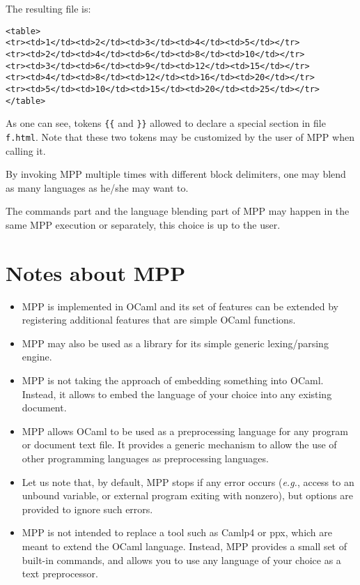 \documentclass[a4paper]{article}
\def\eg{\emph{e.g.}}
\begin{document}
The resulting file is:
\begin{lstlisting}
<table>
<tr><td>1</td><td>2</td><td>3</td><td>4</td><td>5</td></tr>
<tr><td>2</td><td>4</td><td>6</td><td>8</td><td>10</td></tr>
<tr><td>3</td><td>6</td><td>9</td><td>12</td><td>15</td></tr>
<tr><td>4</td><td>8</td><td>12</td><td>16</td><td>20</td></tr>
<tr><td>5</td><td>10</td><td>15</td><td>20</td><td>25</td></tr>
</table>
\end{lstlisting}

As one  can see, tokens \verb+{{+  and \verb+}}+ allowed  to declare a
special section  in file \texttt{f.html}.  Note that  these two tokens
may be customized by the user of MPP when calling it.

By invoking MPP multiple times with different block delimiters, one
may blend as many languages as he/she may want to.

The commands part and the language  blending part of MPP may happen in
the same MPP execution or separately, this choice is up to the user.



\section{Notes about MPP}
\begin{itemize}
\item MPP is implemented in OCaml and its set of features can be
  extended by registering additional features that are simple OCaml
  functions.

\item MPP may also be used as a library for its simple generic
  lexing/parsing engine.


\item MPP is not taking the approach of embedding something into
  OCaml. Instead, it allows to embed the language of your choice into
  any existing document.


\item MPP allows OCaml to be used as a preprocessing language for any
  program or document text file.  It provides a generic mechanism to
  allow the use of other programming languages as preprocessing
  languages.

\item Let us note that, by default, MPP stops if any error occurs
  (\eg, access to an unbound variable, or external program exiting
  with nonzero), but options are provided to ignore such errors.

\item MPP is not intended to replace a tool such as Camlp4 or ppx,
  which are meant to extend the OCaml language. Instead, MPP provides
  a small set of built-in commands, and allows you to use any language
  of your choice as a text preprocessor.

\end{itemize}
\end{document}
